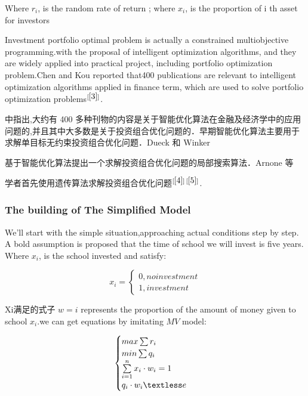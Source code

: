 \documentclass{mcmthesis}
\begin{document}
Where $r_i$, is the random rate of return ;
where $x_i$, is the proportion of i th asset for investors

Investment portfolio optimal problem is actually a constrained multiobjective programming.with the proposal of intelligent optimization algorithms, and they are widely applied into practical project, including portfolio optimization problem.Chen and Kou reported that400 publications are relevant to intelligent optimization algorithms applied in finance term, which are used to solve portfolio optimization problems$^{[\ref{3}]}$.


中指出,大约有 400 多种刊物的内容是关于智能优化算法在金融及经济学中的应用问题的,并且其中大多数是关于投资组合优化问题的．早期智能优化算法主要用于求解单目标无约束投资组合优化问题．Dueck 和 Winker

基于智能优化算法提出一个求解投资组合优化问题的局部搜索算法．Arnone 等

学者首先使用遗传算法求解投资组合优化问题$^{[\ref{4}]}$$^{[\ref{5}]}$.
\par

\subsubsection{The building of The Simplified Model}
We'll start with the simple situation,approaching actual conditions step by step. A bold assumption is proposed that the time of school we will invest is five years. Where $x_i$, is the school invested and satisfy:

\begin{equation}
x_i=
\begin{cases}
0,no investment\\
1,investment
\end{cases}
\end{equation}

Xi满足的式子
$w=i$ represents the proportion of the amount of money given to school $x_i$.we can get equations by imitating $MV$ model:

\begin{equation}
\begin{cases}
max\sum r_i\\
min\sum q_i\\
\sum\limits_{i=1}^{n}x_i\cdot w_i=1\\
q_i\cdot w_i\textless e
\end{cases}
\end{equation}
\end{document}
